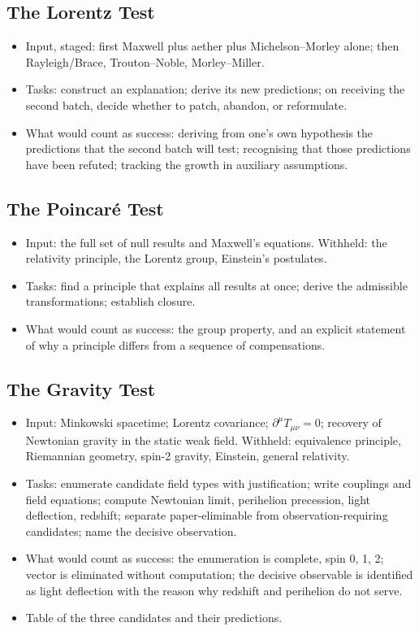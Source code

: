\documentclass{article}
\begin{document}
\subsection{The Lorentz Test}
\begin{itemize}
  \item Input, staged: first Maxwell plus aether plus Michelson--Morley alone; then Rayleigh/Brace, Trouton--Noble, Morley--Miller.
  \item Tasks: construct an explanation; derive its new predictions; on receiving the second batch, decide whether to patch, abandon, or reformulate.
  \item What would count as success: deriving from one's own hypothesis the predictions that the second batch will test; recognising that those predictions have been refuted; tracking the growth in auxiliary assumptions.
\end{itemize}

\subsection{The Poincaré Test}
\begin{itemize}
  \item Input: the full set of null results and Maxwell's equations. Withheld: the relativity principle, the Lorentz group, Einstein's postulates.
  \item Tasks: find a principle that explains all results at once; derive the admissible transformations; establish closure.
  \item What would count as success: the group property, and an explicit statement of why a principle differs from a sequence of compensations.
\end{itemize}

\subsection{The Gravity Test}
\label{sec:gravity-test}
\begin{itemize}
  \item Input: Minkowski spacetime; Lorentz covariance; $\partial^\mu T_{\mu\nu} = 0$; recovery of Newtonian gravity in the static weak field. Withheld: equivalence principle, Riemannian geometry, spin-2 gravity, Einstein, general relativity.
  \item Tasks: enumerate candidate field types with justification; write couplings and field equations; compute Newtonian limit, perihelion precession, light deflection, redshift; separate paper-eliminable from observation-requiring candidates; name the decisive observation.
  \item What would count as success: the enumeration is complete, spin 0, 1, 2; vector is eliminated without computation; the decisive observable is identified as light deflection with the reason why redshift and perihelion do not serve.
  \item Table of the three candidates and their predictions.
\end{itemize}
\end{document}
